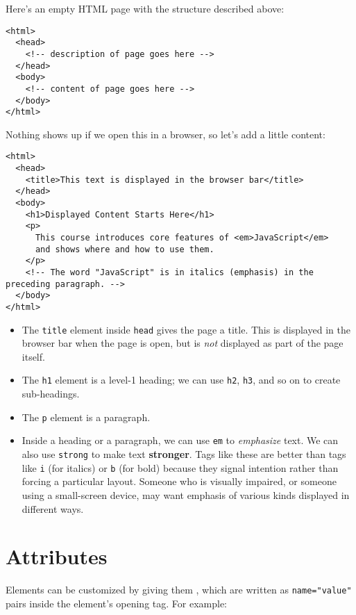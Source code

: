Here's an empty HTML page with the structure described above:

\begin{verbatim}
<html>
  <head>
    <!-- description of page goes here -->
  </head>
  <body>
    <!-- content of page goes here -->
  </body>
</html>
\end{verbatim}

Nothing shows up if we open this in a browser,
so let's add a little content:

\begin{verbatim}
<html>
  <head>
    <title>This text is displayed in the browser bar</title>
  </head>
  <body>
    <h1>Displayed Content Starts Here</h1>
    <p>
      This course introduces core features of <em>JavaScript</em>
      and shows where and how to use them.
    </p>
    <!-- The word "JavaScript" is in italics (emphasis) in the preceding paragraph. -->
  </body>
</html>
\end{verbatim}

\begin{itemize}
\item
  The \texttt{title} element inside \texttt{head} gives the page a title.
  This is displayed in the browser bar when the page is open,
  but is \emph{not} displayed as part of the page itself.
\item
  The \texttt{h1} element is a level-1 heading;
  we can use \texttt{h2}, \texttt{h3}, and so on to create sub-headings.
\item
  The \texttt{p} element is a paragraph.
\item
  Inside a heading or a paragraph,
  we can use \texttt{em} to \emph{emphasize} text.
  We can also use \texttt{strong} to make text \textbf{stronger}.
  Tags like these are better than tags like \texttt{i} (for italics) or \texttt{b} (for bold)
  because they signal intention rather than forcing a particular layout.
  Someone who is visually impaired, or someone using a small-screen device,
  may want emphasis of various kinds displayed in different ways.
\end{itemize}

\section{Attributes}\label{s:htmlcss-attributes}

Elements can be customized by giving them ,
which are written as \texttt{name="value"} pairs inside the element's opening tag.
For example:

